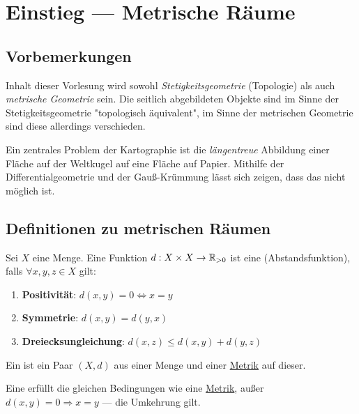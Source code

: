 \chapter{Einstieg --- Metrische Räume}

\section{Vorbemerkungen}

Inhalt dieser Vorlesung wird sowohl \emph{Stetigkeitsgeometrie} (Topologie) als auch \emph{metrische Geometrie} sein. Die seitlich abgebildeten Objekte sind im Sinne der Stetigkeitsgeometrie "topologisch äquivalent", im Sinne der metrischen Geometrie sind diese allerdings verschieden.

\begin{remark}[Kartographieproblem]
  Ein zentrales Problem der Kartographie ist die \emph{längentreue} Abbildung einer Fläche auf der Weltkugel auf eine Fläche auf Papier. Mithilfe der Differentialgeometrie und der Gauß-Krümmung lässt sich zeigen, dass das nicht möglich ist.
\end{remark}

\section{Definitionen zu metrischen Räumen}

\begin{definition}[Metrik]
  \label{def:metrik}
  Sei $ X $ eine Menge. Eine Funktion $ d: X \times X \to \mathbb{R}_{>0} $ ist eine  (Abstandsfunktion), falls $ \forall x, y, z \in X $ gilt:
  \begin{enumerate}
    \item \textbf{Positivität}: $ d(x, y) = 0 \Leftrightarrow x = y $ 
    \item \textbf{Symmetrie}: $ d(x,y) = d(y,x) $
    \item \textbf{Dreiecksungleichung}: $ d(x,z) \leq d(x,y) + d(y,z) $
  \end{enumerate}
\end{definition}

\begin{definition}
  \label{def:metrischerRaum}
  Ein  ist ein Paar $ (X,d) $ aus einer Menge und einer \hyperref[def:metrik]{Metrik} auf dieser.
\end{definition}

\begin{definition}[Pseudometrik]
  \label{def:pseudometrik}
  Eine  erfüllt die gleichen Bedingungen wie eine \hyperref[def:metrik]{Metrik}, außer $ d(x,y) = 0 \Rightarrow x = y $ --- die Umkehrung gilt.
\end{definition}

